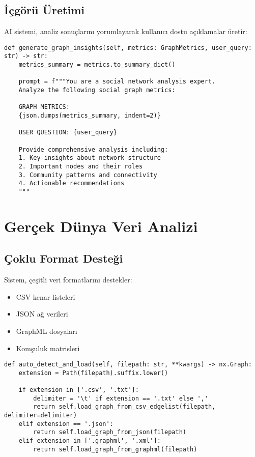 \documentclass[conference]{IEEEtran}
\begin{document}
\subsection{İçgörü Üretimi}

AI sistemi, analiz sonuçlarını yorumlayarak kullanıcı dostu açıklamalar üretir:

\begin{lstlisting}[caption=AI Destekli İçgörü Üretimi]
def generate_graph_insights(self, metrics: GraphMetrics, user_query: str) -> str:
    metrics_summary = metrics.to_summary_dict()
    
    prompt = f"""You are a social network analysis expert. 
    Analyze the following social graph metrics:
    
    GRAPH METRICS:
    {json.dumps(metrics_summary, indent=2)}
    
    USER QUESTION: {user_query}
    
    Provide comprehensive analysis including:
    1. Key insights about network structure
    2. Important nodes and their roles
    3. Community patterns and connectivity
    4. Actionable recommendations
    """
\end{lstlisting}

\section{Gerçek Dünya Veri Analizi}

\subsection{Çoklu Format Desteği}

Sistem, çeşitli veri formatlarını destekler:

\begin{itemize}
\item CSV kenar listeleri
\item JSON ağ verileri
\item GraphML dosyaları
\item Komşuluk matrisleri
\end{itemize}

\begin{lstlisting}[caption=Otomatik Format Tespiti]
def auto_detect_and_load(self, filepath: str, **kwargs) -> nx.Graph:
    extension = Path(filepath).suffix.lower()
    
    if extension in ['.csv', '.txt']:
        delimiter = '\t' if extension == '.txt' else ','
        return self.load_graph_from_csv_edgelist(filepath, delimiter=delimiter)
    elif extension == '.json':
        return self.load_graph_from_json(filepath)
    elif extension in ['.graphml', '.xml']:
        return self.load_graph_from_graphml(filepath)
\end{lstlisting}
\end{document}
